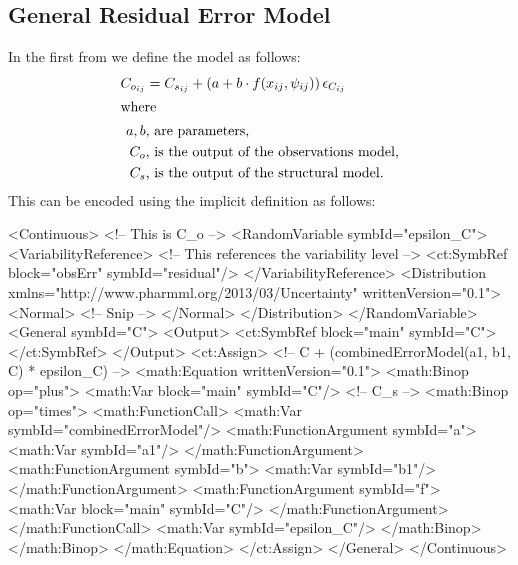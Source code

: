 \documentclass[a4paper,11pt]{article}
\begin{document}
\subsection{General Residual Error Model}

In the first from we define the model as follows:
%
\begin{align*}
C_{o_{ij}} &= C_{s_{ij}} + \left(a + b \cdot f(x_{ij}, \psi_{ij}) \right) \epsilon_{C_{ij}}\\
\intertext{where}
a, b & \text{, are parameters,}\\
C_{o} & \text{, is the output of the observations model,}\\
C_{s} & \text{, is the output of the structural model.}
\end{align*}
%
This can be encoded using the implicit definition as follows:
%
\begin{xmlcode}
<Continuous> <!-- This is C_{o} -->
    <RandomVariable symbId="epsilon_C">
        <VariabilityReference> <!-- This references the variability level -->
            <ct:SymbRef block="obsErr" symbId="residual"/>
        </VariabilityReference>
        <Distribution xmlns="http://www.pharmml.org/2013/03/Uncertainty"
            writtenVersion="0.1">
            <Normal>
              <!-- Snip -->
            </Normal>
        </Distribution>
    </RandomVariable>
    <General  symbId="C">
        <Output>
            <ct:SymbRef block="main" symbId="C"></ct:SymbRef>
        </Output>
        <ct:Assign>
            <!-- C + (combinedErrorModel(a1, b1, C) * epsilon_C) -->
            <math:Equation writtenVersion="0.1">
                <math:Binop op="plus">
                    <math:Var block="main" symbId="C"/> <!-- C_{s} -->
                    <math:Binop op="times">
                        <math:FunctionCall>
                            <math:Var symbId="combinedErrorModel"/>
                            <math:FunctionArgument symbId="a">
                                <math:Var symbId="a1"/>
                            </math:FunctionArgument>
                            <math:FunctionArgument symbId="b">
                                <math:Var symbId="b1"/>
                            </math:FunctionArgument>
                            <math:FunctionArgument symbId="f">
                                <math:Var block="main" symbId="C"/>
                            </math:FunctionArgument>
                        </math:FunctionCall>
                        <math:Var symbId="epsilon_C"/>
                    </math:Binop>
                </math:Binop>
            </math:Equation>
        </ct:Assign>
    </General>
</Continuous>
\end{xmlcode}
\end{document}
